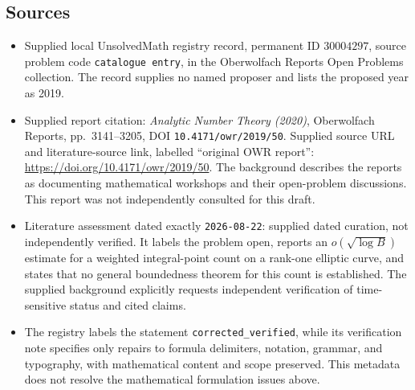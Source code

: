 \documentclass[11pt]{article}
\begin{document}
\subsection{Sources}
\begin{itemize}
\item Supplied local UnsolvedMath registry record, permanent ID \(30004297\), source problem code \texttt{catalogue entry}, in the Oberwolfach Reports Open Problems collection. The record supplies no named proposer and lists the proposed year as 2019.
\item Supplied report citation: \emph{Analytic Number Theory (2020)}, Oberwolfach Reports, pp.\ 3141--3205, DOI \texttt{10.4171/owr/2019/50}. Supplied source URL and literature-source link, labelled ``original OWR report'': \url{https://doi.org/10.4171/owr/2019/50}. The background describes the reports as documenting mathematical workshops and their open-problem discussions. This report was not independently consulted for this draft.
\item Literature assessment dated exactly \texttt{2026-08-22}: supplied dated curation, not independently verified. It labels the problem open, reports an \(o(\sqrt{\log B})\) estimate for a weighted integral-point count on a rank-one elliptic curve, and states that no general boundedness theorem for this count is established. The supplied background explicitly requests independent verification of time-sensitive status and cited claims.
\item The registry labels the statement \texttt{corrected\_verified}, while its verification note specifies only repairs to formula delimiters, notation, grammar, and typography, with mathematical content and scope preserved. This metadata does not resolve the mathematical formulation issues above.
\end{itemize}
\end{document}
